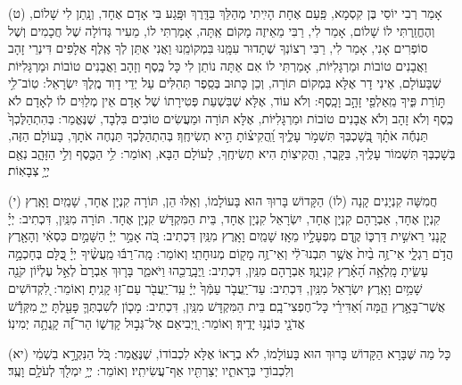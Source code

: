 \documentclass[twoside, openany, parskip=half, 11pt]{book}
\begin{document}
\vspace{0.5\baselineskip}

(ט) 
 אָמַר רְבִי יוֹסֵי בֶּן קִסְמָא, פַּֽעַם אֶחָת הָיִֽיתִי מְהַלֵּךְ בַּדָּֽרֶךְ וּפָּֽגַע בִּי אָדָם אֶחָד, וְנָֽתַן לִי שָׁלוֹם, וְהֶחֱזַֽרְתִּי לוֹ שָׁלוֹם, אָמַר לִי, רַבִּי מֵאֵיזֶה מָקוֹם אַֽתָּה, אָמַרְתִּי לוֹ, מֵעִיר גְּדוֹלָה שֶׁל חֲכָמִים וְשֶׁל סוֹפְרִים אָנִי, אָמַר לִי, רַבִּי רְצוֹנְךָ שֶׁתָדוּר עִמָּֽנוּ בִּמְקוֹמֵֽנוּ וַאֲנִי אֶתֵּן לְךָ אֶֽלֶף אֲלָפִים דִּינְרֵי זָהָב וַאֲבָנִים טוֹבוֹת וּמַרְגָּלִיּוֹת, אָמַרְתִּי לוֹ אִם אַתָּה נוֹתֵן לִי כָּל כֶּֽסֶף וְזָהָב וַאֲבָנִים טוֹבוֹת וּמַרְגָּלִיּוֹת שֶׁבָּעוֹלָם, אֵינִי דָר אֶלָּא בִּמְקוֹם תּוֹרָה, וְכֵן כָּתוּב בְּסֵֽפֶר תְּהִלִּים עַל יְדֵי דָוִד מֶֽלֶךְ יִשְׂרָאֵל: טֽוֹב־לִ֥י תּ֣וֹרַת פִּ֑יךָ מֵֽאַלְפֵ֖י זָהָ֣ב וָכָֽסֶף: וְלֹא עוֹד, אֶלָּא שֶׁבִּשְׁעַת פְּטִירָתוֹ שֶׁל אָדָם אֵין מְלַוִּים לוֹ לְאָדָם לֹא כֶֽסֶף וְלֹא זָהָב וְלֹא אֲבָנִים טוֹבוֹת וּמַרְגָּלִיּוֹת, אֶלָּא תּוֹרָה וּמַעֲשִׂים טוֹבִים בִּלְבָד, שֶׁנֶּאֱמַר: בְּהִתְהַלֶּכְךָ֙   תַּנְחֶ֬ה אֹתָ֗ךְ בְּֽ֭שָׁכְבְּךָ תִּשְׁמֹ֣ר עָלֶ֑יךָ וַֽ֝הֲקִיצ֗וֹתָ הִ֣יא תְשִׂיחֶֽךָ׃ בְּהִתְהַלֶּכְךָ תַּנְחֶה אֹתָךְ, בָּעוֹלָם הַזֶּה, בְּשָׁכְבְּךָ תִּשְׁמוֹר עָלֶֽיךָ, בַּקָּֽבֶר, וַהֲקִיצֽוֹתָ הִיא תְשִׂיחֶֽךָ, לָעוֹלָם הַבָּא, וְאוֹמֵר: לִ֥י הַכֶּ֖סֶף וְלִ֣י הַזָּהָ֑ב נְאֻ֖ם יְיָ֥ צְבָאֽוֹת׃

\vspace{0.5\baselineskip}

(י)
חֲמִשָּׁה קִנְיָנִים קָנָה (לוֹ) הַקָּדוֹשׁ בָּרוּךְ הוּא בָּעוֹלָמוֹ, וְאֵֽלּוּ הֵן, תּוֹרָה קִנְיָן אֶחָד, שָׁמַֽיִם וָאָֽרֶץ קִנְיָן אֶחָד, אַבְרָהָם קִנְיָן אֶחָד, יִשְׂרָאֵל קִנְיָן אֶחָד, בֵּית הַמִּקְדָּשׁ קִנְיָן אֶחָד. תּוֹרָה מִנַּֽיִן, דִּכְתִיב: יְיָ֗ קָ֭נָנִי רֵאשִׁ֣ית דַּרְכּ֑וֹ קֶ֖דֶם מִפְעָלָ֣יו מֵאָֽז׃ שָׁמַֽיִם וָאָֽרֶץ מִנַּֽיִן דִּכְתִיב: כֹּ֚ה אָמַ֣ר יְיָ֔ הַשָּׁמַ֣יִם כִּסְאִ֔י וְהָאָ֖רֶץ הֲדֹ֣ם רַגְלָ֑י אֵי־זֶ֥ה בַ֨יִת֙ אֲשֶׁ֣ר תִּבְנוּ־לִ֔י וְאֵי־זֶ֥ה מָק֖וֹם מְנוּחָתִֽי׃ וְאוֹמֵר: מָֽה־רַבּ֬וּ מַֽעֲשֶׂ֨יךָ   יְיָ֗ כֻּ֭לָּם בְּחָכְמָ֣ה עָשִׂ֑יתָ מָֽלְאָ֥ה הָ֝אָ֗רֶץ קִנְיָנֶֽךָ׃ אַבְרָהָם מִנַּֽיִן, דִּכְתִיב: וַֽיְבָֽרֲכֵ֖הוּ וַיֹּאמַ֑ר בָּר֤וּךְ אַבְרָם֙ לְאֵ֣ל עֶלְי֔וֹן קֹנֵ֖ה שָׁמַ֥יִם וָאָֽרֶץ׃ יִשְׂרָאֵל מִנַּֽיִן, דִּכְתִיב: עַד־יַֽעֲבֹ֤ר עַמְּֿךָ֙ יְיָ֔ עַֽד־יַֽעֲבֹ֖ר עַם־ז֥וּ קָנִֽיתָ׃ וְאוֹמֵר: לִ֭קְדוֹשִׁים אֲשֶׁר־בָּאָ֣רֶץ הֵ֑מָּה וְ֝אַדִּירֵ֗י כָּל־חֶפְצִי־בָֽם׃ בֵּית הַמִּקְדָּשׁ מִנַּֽיִן, דִּכְתִיב: מָכ֧וֹן לְשִׁבְתְּךָ֛ פָּעַ֖לְתָּ יְיָ֑ מִקְּדָ֕שׁ אֲדֹנָ֖י כּֽוֹנֲנ֥וּ יָדֶֽיךָ׃ וְאוֹמֵר: וַ֭יְבִיאֵם אֶל־גְּב֣וּל קָדְשׁ֑וֹ הַר־זֶ֝֗ה קָֽנְתָ֥ה יְמִינֽוֹ׃

(יא)
 כָּל מַה שֶּׁבָּרָא הַקָּדוֹשׁ בָּרוּךְ הוּא בָּעוֹלָמוֹ, לֹא בְרָאוֹ אֶלָּא לִכְבוֹדוֹ, שֶׁנֶּאֱמַר: כֹּ֚ל הַנִּקְרָ֣א בִשְׁמִ֔י וְלִכְבוֹדִ֖י בְּרָאתִ֑יו יְצַרְתִּ֖יו אַף־עֲשִׂיתִֽיו׃ וְאוֹמֵר: יְיָ֥  יִמְלֹ֖ךְ לְעֹלָ֥ם וָעֶֽד׃
\end{document}
